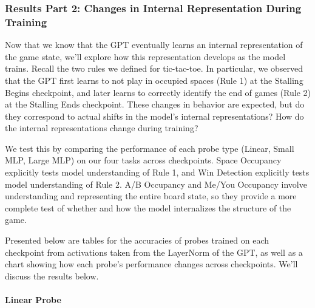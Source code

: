 \documentclass[11pt]{article}
\begin{document}
    \subsubsection{Results Part 2: Changes in Internal Representation During
Training}\label{results-part-2-changes-in-internal-representation-during-training}

Now that we know that the GPT eventually learns an internal
representation of the game state, we'll explore how this representation
develops as the model trains. Recall the two rules we defined for
tic-tac-toe. In particular, we observed that the GPT first learns to not
play in occupied spaces (Rule 1) at the Stalling Begins checkpoint, and
later learns to correctly identify the end of games (Rule 2) at the
Stalling Ends checkpoint. These changes in behavior are expected, but do
they correspond to actual shifts in the model's internal
representations? How do the internal representations change during
training?

We test this by comparing the performance of each probe type (Linear,
Small MLP, Large MLP) on our four tasks across checkpoints. Space
Occupancy explicitly tests model understanding of Rule 1, and Win
Detection explicitly tests model understanding of Rule 2. A/B Occupancy
and Me/You Occupancy involve understanding and representing the entire
board state, so they provide a more complete test of whether and how the
model internalizes the structure of the game.

Presented below are tables for the accuracies of probes trained on each
checkpoint from activations taken from the LayerNorm of the GPT, as well
as a chart showing how each probe's performance changes across
checkpoints. We'll discuss the results below.

    \paragraph{Linear Probe}\label{linear-probe}
\end{document}
